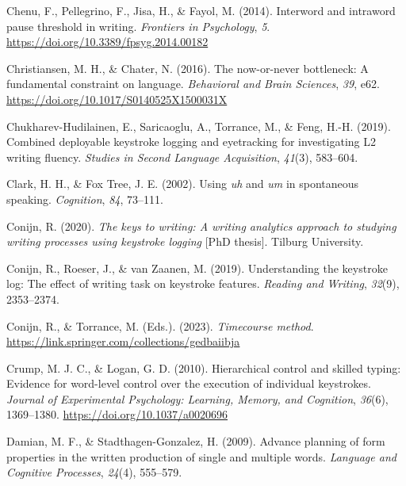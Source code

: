 \documentclass[
  man,floatsintext]{apa7}
\newlength{\cslhangindent}
\newlength{\cslentryspacingunit} %
\newenvironment{CSLReferences}[2] %
 {%
  \setlength{\parindent}{0pt}
  \ifodd #1
  \let\oldpar\par
  \def\par{\hangindent=\cslhangindent\oldpar}
  \fi
  \setlength{\parskip}{#2\cslentryspacingunit}
 }%
 {}
\begin{document}
\begin{CSLReferences}{1}{0}
\leavevmode{}%
Chenu, F., Pellegrino, F., Jisa, H., \& Fayol, M. (2014). Interword and intraword pause threshold in writing. \emph{Frontiers in Psychology}, \emph{5}. \url{https://doi.org/10.3389/fpsyg.2014.00182}

\leavevmode{}%
Christiansen, M. H., \& Chater, N. (2016). The now-or-never bottleneck: A fundamental constraint on language. \emph{Behavioral and Brain Sciences}, \emph{39}, e62. \url{https://doi.org/10.1017/S0140525X1500031X}

\leavevmode{}%
Chukharev-Hudilainen, E., Saricaoglu, A., Torrance, M., \& Feng, H.-H. (2019). Combined deployable keystroke logging and eyetracking for investigating {L2} writing fluency. \emph{Studies in Second Language Acquisition}, \emph{41}(3), 583--604.

\leavevmode{}%
Clark, H. H., \& Fox Tree, J. E. (2002). Using \emph{uh} and \emph{um} in spontaneous speaking. \emph{Cognition}, \emph{84}, 73--111.

\leavevmode{}%
Conijn, R. (2020). \emph{The keys to writing: A writing analytics approach to studying writing processes using keystroke logging} {[}PhD thesis{]}. Tilburg University.

\leavevmode{}%
Conijn, R., Roeser, J., \& van Zaanen, M. (2019). Understanding the keystroke log: The effect of writing task on keystroke features. \emph{Reading and Writing}, \emph{32}(9), 2353--2374.

\leavevmode{}%
Conijn, R., \& Torrance, M. (Eds.). (2023). \emph{Timecourse method}. \url{https://link.springer.com/collections/gedbaiibja}

\leavevmode{}%
Crump, M. J. C., \& Logan, G. D. (2010). Hierarchical control and skilled typing: Evidence for word-level control over the execution of individual keystrokes. \emph{Journal of Experimental Psychology: Learning, Memory, and Cognition}, \emph{36}(6), 1369--1380. \url{https://doi.org/10.1037/a0020696}

\leavevmode{}%
Damian, M. F., \& Stadthagen-Gonzalez, H. (2009). Advance planning of form properties in the written production of single and multiple words. \emph{Language and Cognitive Processes}, \emph{24}(4), 555--579.


\end{CSLReferences}
\end{document}
